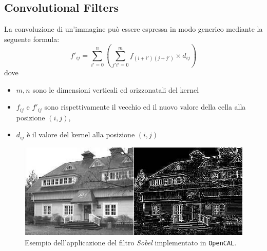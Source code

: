 \subsection{Convolutional Filters}
\label{sec:convolutional_filters}
La convoluzione di un'immagine può essere espressa in modo generico mediante la seguente formula:
\begin{equation}
f'_{ij} = \sum_{i'=0}^n (\sum_{j'i'=0}^m f_{(i+i')(j+j')}\times d_{ij})
\label{eq:convolution}
\end{equation}
dove
\begin{itemize}
	\item $m,n$ sono le dimensioni verticali ed orizzonatali del kernel
	\item $f_{ij}$ e $f'_{ij}$ sono rispettivamente il vecchio ed il nuovo valore della cella alla posizione $(i,j)$,
	\item $d_{ij}$ è il valore del kernel alla posizione $(i,j)$ 
\end{itemize}
\begin{figure}[!htb]
	\includegraphics[width=\linewidth]{./images/sobel_example}
	
	\caption{Esempio dell'applicazione del filtro \textit{Sobel} implementato in \texttt{OpenCAL}. }
	\label{fig:sobel}
\end{figure}

